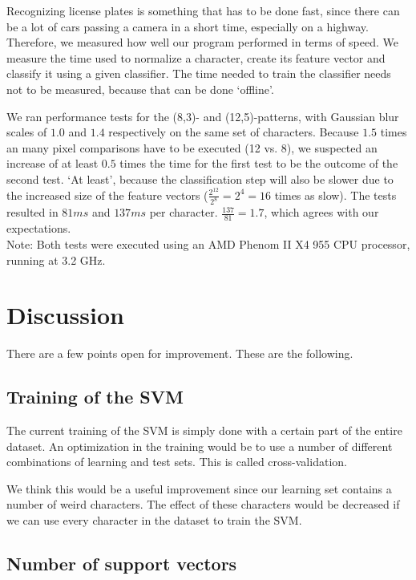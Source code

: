 \documentclass[a4paper]{article}
\begin{document}
Recognizing license plates is something that has to be done fast, since there
can be a lot of cars passing a camera in a short time, especially on a highway.
Therefore, we measured how well our program performed in terms of speed. We
measure the time used to normalize a character, create its feature vector and
classify it using a given classifier. The time needed to train the classifier
needs not to be measured, because that can be done `offline'.

We ran performance tests for the (8,3)- and (12,5)-patterns, with Gaussian blur
scales of $1.0$ and $1.4$ respectively on the same set of characters. Because
$1.5$ times an many pixel comparisons have to be executed (12 vs. 8), we
suspected an increase of at least $0.5$ times the time for the first test to be
the outcome of the second test. `At least', because the classification step
will also be slower due to the increased size of the feature vectors
($\frac{2^{12}}{2^8} = 2^4 = 16$ times as slow). The tests resulted in $81ms$
and $137ms$ per character. $\frac{137}{81} = 1.7$, which agrees with our
expectations. \\
Note: Both tests were executed using an AMD Phenom II X4 955 CPU processor,
running at 3.2 GHz.

\section{Discussion}

There are a few points open for improvement. These are the following.

\subsection{Training of the SVM}

The current training of the SVM is simply done with a certain part of the
entire dataset. An optimization in the training would be to use a number of
different combinations of learning and test sets. This is called
cross-validation.

We think this would be a useful improvement since our learning set contains a
number of weird characters. The effect of these characters would be decreased
if we can use every character in the dataset to train the SVM.

\subsection{Number of support vectors}
\end{document}

